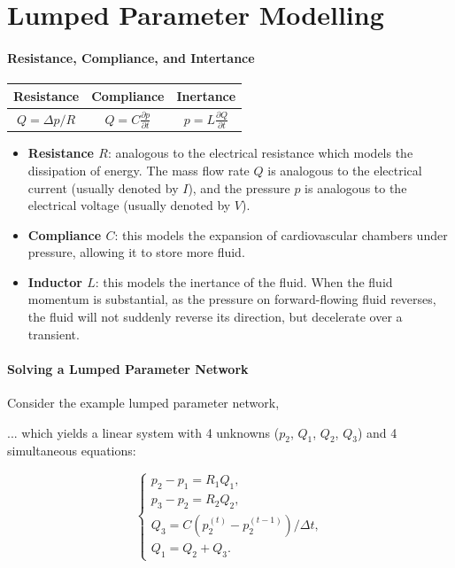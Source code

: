 \documentclass[a4paper]{article}
\begin{document}
\section{Lumped Parameter Modelling}
\paragraph{Resistance, Compliance, and Intertance}
\begin{center}
    \begin{tabular}{ccc}
    \toprule
        Resistance & Compliance & Inertance  \\ [.2em]
    \midrule
        $Q = \Delta p / R$ & $\displaystyle Q = C \frac{\partial p}{\partial t}$ & $\displaystyle p = L \frac{\partial Q}{\partial t}$ \\ [.2em]
    \bottomrule
    \end{tabular}
\end{center}
\begin{itemize}
    \item \textbf{Resistance $R$}: analogous to the electrical resistance which models the dissipation of energy. The mass flow rate $Q$ is analogous to the electrical current (usually denoted by $I$), and the pressure $p$ is analogous to the electrical voltage (usually denoted by $V$).
    \item \textbf{Compliance $C$}: this models the expansion of cardiovascular chambers under pressure, allowing it to store more fluid.
    \item \textbf{Inductor $L$}: this models the inertance of the fluid. When the fluid momentum is substantial, as the pressure on forward-flowing fluid reverses, the fluid will not suddenly reverse its direction, but decelerate over a transient.
\end{itemize}

\paragraph{Solving a Lumped Parameter Network} Consider the example lumped parameter network, \\

\begin{minipage}{0.5\textwidth}
    
\end{minipage}
\hfill
\begin{minipage}{0.5\textwidth}
... which yields a linear system with 4 unknowns ($p_2$, $Q_1$, $Q_2$, $Q_3$) and 4 simultaneous equations:

\begin{equation*}
    \begin{cases}
        p_2 - p_1 = R_1 Q_1, \\[.6em]
        p_3 - p_2 = R_2 Q_2, \\[.6em]
        Q_3 = C (p_2^{(t)} - p_2^{(t-1)})/\Delta t,\\[.6em]
        Q_1 = Q_2 + Q_3.
    \end{cases}
\end{equation*}
\end{minipage}
\end{document}
